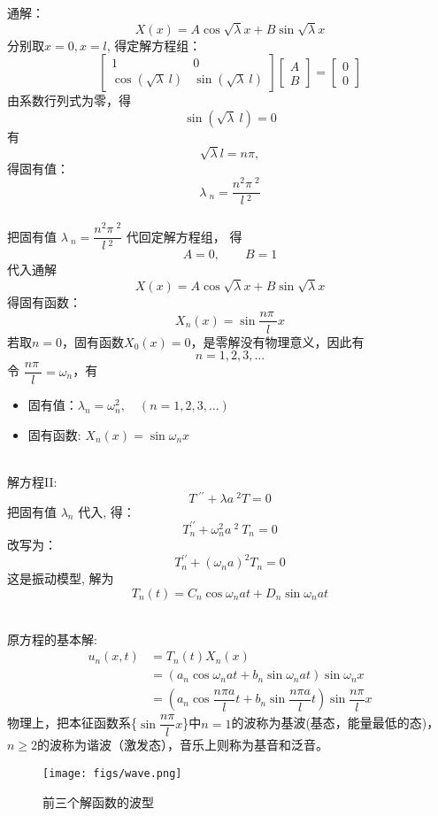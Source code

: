 通解：$$ X(x)=A\cos \sqrt{\lambda}x+ B\sin \sqrt{\lambda}x  $$  
分别取$x=0, x=l$, 得定解方程组：
$$ \left[
	\begin{array}{lll}
		1&0\\
		\cos( {\sqrt{\lambda}~l}) &\sin ({\sqrt{\lambda}~l})
	\end{array}
	\right]
\left[
	\begin{array}{ll}
		A\\
		B
	\end{array}
	\right]=
\left[
	\begin{array}{ll}
		0\\
		0
	\end{array}
	\right] $$
由系数行列式为零，得
	$$ \sin ({\sqrt{\lambda}~l})=0  $$
有
	$$ \sqrt{\lambda} l = n \pi,  $$ 
得固有值：$$ \boxed{\lambda~_n = \dfrac{n^2 \pi~^2 }{l~^2 }} $$ \\ 
把固有值 $ \lambda~_n= \dfrac{n^2 \pi~^2 }{l~^2 } $ 代回定解方程组， 得
$$ A= 0,\qquad B=1$$ 
代入通解
$$ X(x)=A\cos \sqrt{\lambda}x+ B\sin \sqrt{\lambda}x  $$
得固有函数：$$ \boxed{X_n(x)=\sin \dfrac{n\pi~}{l} x}   $$ 
若取$n =0$，固有函数$X_0(x)=0$，是零解没有物理意义，因此有
\[ n =1, 2, 3, \dots \]
令 $\dfrac{n\pi~}{l} =\omega_n $，有 \\
\begin{itemize}
	\item 固有值：$\lambda_n = \omega_n^2, \quad (n =1, 2, 3, \dots)$
	\item 固有函数: $X_n(x)= \sin \omega_n x$
\end{itemize} 

~~\\ 
解方程II:$$  T~^{\prime\prime} +\lambda {a~^2 T}=0   $$ 
把固有值 $\lambda_n$ 代入, 得：
$$ T_n ^{\prime\prime} +\omega ^2_n a~^2 ~T_n=0  $$  
改写为：
$$ T_n ^{\prime\prime} + (\omega_n a)^2 T_n=0  $$ 
这是振动模型, 解为
$$ T_n(t) = C _n \cos \omega_n a t+ D _n \sin \omega _n a t   $$ 

~~\\ 
原方程的基本解:
$$ \begin{aligned}
	u_n(x,t) &= T_n(t)X_n(x)\\
		&=(a_n\cos \omega_nat+ b_n\sin \omega _nat ) \sin \omega_n x\\
		&=(a_n\cos\dfrac{ n\pi a}{l}t+ b_n\sin \dfrac{ n\pi a}{l}t) \sin \dfrac{ n\pi }{l}x
\end{aligned}  $$
物理上，把本征函数系\{$\sin \dfrac{ n\pi }{l}x$\}中$n=1$的波称为基波(基态，能量最低的态)，$n\geq 2$的波称为谐波（激发态），音乐上则称为基音和泛音。
\begin{figure}[h]
	\centering
	\texttt{[image: figs/wave.png]}
	\caption{前三个解函数的波型}
	\label{fig:wave}
\end{figure}

